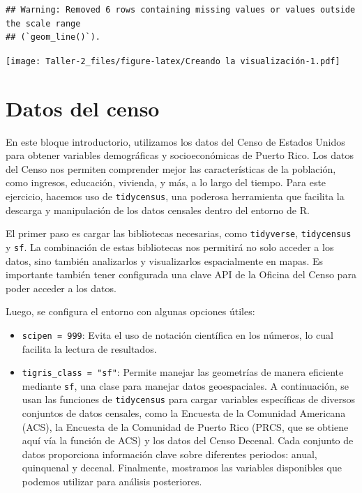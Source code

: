 \documentclass[
]{article}
\begin{document}
\begin{verbatim}
## Warning: Removed 6 rows containing missing values or values outside the scale range
## (`geom_line()`).
\end{verbatim}

\texttt{[image: Taller-2\_files/figure-latex/Creando la visualización-1.pdf]}

\section{Datos del censo}\label{datos-del-censo}

En este bloque introductorio, utilizamos los datos del Censo de Estados
Unidos para obtener variables demográficas y socioeconómicas de Puerto
Rico. Los datos del Censo nos permiten comprender mejor las
características de la población, como ingresos, educación, vivienda, y
más, a lo largo del tiempo. Para este ejercicio, hacemos uso de
\texttt{tidycensus}, una poderosa herramienta que facilita la descarga y
manipulación de los datos censales dentro del entorno de R.

El primer paso es cargar las bibliotecas necesarias, como
\texttt{tidyverse}, \texttt{tidycensus} y \texttt{sf}. La combinación de
estas bibliotecas nos permitirá no solo acceder a los datos, sino
también analizarlos y visualizarlos espacialmente en mapas. Es
importante también tener configurada una clave API de la Oficina del
Censo para poder acceder a los datos.

Luego, se configura el entorno con algunas opciones útiles:

\begin{itemize}
\item
  \texttt{scipen\ =\ 999}: Evita el uso de notación científica en los
  números, lo cual facilita la lectura de resultados.
\item
  \texttt{tigris\_class\ =\ "sf"}: Permite manejar las geometrías de
  manera eficiente mediante \texttt{sf}, una clase para manejar datos
  geoespaciales. A continuación, se usan las funciones de
  \texttt{tidycensus} para cargar variables específicas de diversos
  conjuntos de datos censales, como la Encuesta de la Comunidad
  Americana (ACS), la Encuesta de la Comunidad de Puerto Rico (PRCS, que
  se obtiene aquí vía la función de ACS) y los datos del Censo Decenal.
  Cada conjunto de datos proporciona información clave sobre diferentes
  periodos: anual, quinquenal y decenal. Finalmente, mostramos las
  variables disponibles que podemos utilizar para análisis posteriores.
\end{itemize}
\end{document}
